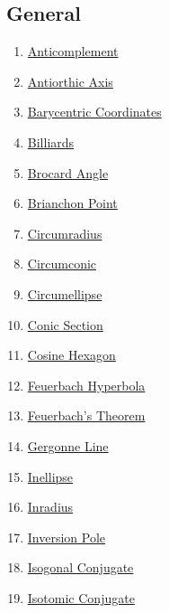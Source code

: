 \documentclass[]{article}
\providecommand{\tightlist}{%
  \setlength{\itemsep}{0pt}\setlength{\parskip}{0pt}}
\begin{document}
\hypertarget{general}{%
\subsection{General}\label{general}}

\begin{enumerate}
\def\labelenumi{\arabic{enumi}.}
\tightlist
\item
  \href{http://mathworld.wolfram.com/Anticomplement.html}{Anticomplement}
\item
  \href{http://mathworld.wolfram.com/AntiorthicAxis.html}{Antiorthic Axis}
\item
  \href{http://mathworld.wolfram.com/BarycentricCoordinates.html}{Barycentric Coordinates}
\item
  \href{http://mathworld.wolfram.com/Billiards.html}{Billiards}
\item
  \href{http://mathworld.wolfram.com/BrocardAngle.html}{Brocard Angle}
\item
  \href{http://mathworld.wolfram.com/BrianchonPoint.html}{Brianchon Point}
\item
  \href{http://mathworld.wolfram.com/Circumradius.html}{Circumradius}
\item
  \href{http://mathworld.wolfram.com/Circumconic.html}{Circumconic}
\item
  \href{http://mathworld.wolfram.com/Circumellipse.html}{Circumellipse}
\item
  \href{http://mathworld.wolfram.com/ConicSection.html}{Conic Section}
\item
  \href{http://mathworld.wolfram.com/CosineCircle.html}{Cosine Hexagon}
\item
  \href{http://mathworld.wolfram.com/FeuerbachHyperbola.html}{Feuerbach Hyperbola}
\item
  \href{http://mathworld.wolfram.com/FeuerbachsTheorem.html}{Feuerbach's Theorem}
\item
  \href{http://mathworld.wolfram.com/GergonneLine.html}{Gergonne Line}
\item
  \href{http://mathworld.wolfram.com/Inellipse.html}{Inellipse}
\item
  \href{http://mathworld.wolfram.com/Inradius.html}{Inradius}
\item
  \href{http://mathworld.wolfram.com/InversionPole.html}{Inversion Pole}
\item
  \href{http://mathworld.wolfram.com/IsogonalConjugate.html}{Isogonal Conjugate}
\item
  \href{http://mathworld.wolfram.com/IsogotomicConjugate.html}{Isotomic Conjugate}

\end{enumerate}
\end{document}

